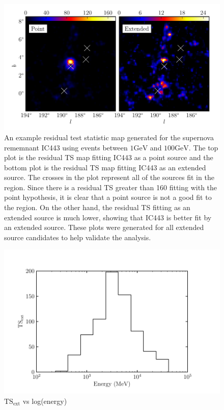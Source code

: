 \documentclass[preprint]{aastex}
\newcommand{\gev}{\text{GeV}\xspace}
\newcommand{\tsext}{\ensuremath{\text{TS}_\text{ext}}\xspace}
\begin{document}
\begin{figure}
  \begin{center}
  \includegraphics{ic443_plots/res_tsmap_ic443.pdf}

  \caption{An example residual test statistic map generated for the
  supernova rememnant IC443 using events between $1\gev$ and
  $100\gev$.  The top plot is the residual TS map fitting IC443
  as a point source and the bottom plot is the residual TS map fitting
  IC443 as an extended source. The crosses in the plot represent all of
  the sources fit in the region. Since there is a residual TS greater
  than 160 fitting with the point hypothesis, it is clear that a point
  source is not a good fit to the region. On the other hand,
  the residual TS fitting as an extended source is much lower, showing
  that IC443 is better fit by an extended source. These plots were generated
  for all extended source candidates to help validate the analysis.}
  \label{res_tsmaps}
  \end{center}
\end{figure}

\clearpage
\begin{figure}
  \begin{center}
    \includegraphics{ic443_plots/ic443_ts_ext_vs_energy.pdf}
    \caption{\tsext vs log(energy)}
    \label{counts_slice}
  \end{center}
\end{figure}
\end{document}

